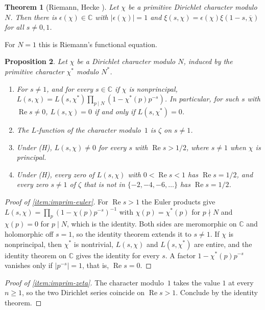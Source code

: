 \documentclass[11pt]{amsbook}
\theoremstyle{plain}
\newtheorem{theorem}{Theorem}[section]
\newtheorem{proposition}[theorem]{Proposition}
\theoremstyle{definition}
\theoremstyle{remark}
\numberwithin{equation}{section}
\numberwithin{figure}{chapter}
\numberwithin{table}{chapter}
\renewcommand{\C}{\mathbb{C}}
\begin{document}
\begin{theorem}[Riemann, Hecke \cite{Davenport2000,Riemann1859}]
\label{thm:fe}
Let $\chi$ be a primitive Dirichlet character modulo $N$. Then there is
$\epsilon(\chi)\in\C$ with $|\epsilon(\chi)|=1$ and
$\xi(s,\chi)=\epsilon(\chi)\xi(1-s,\overline\chi)$ for all $s\ne0,1$.
\end{theorem}

\noindent For $N=1$ this is Riemann's functional equation.

\begin{proposition}\label{prop:imprimitive}
Let $\chi$ be a Dirichlet character modulo $N$, induced by the
primitive character $\chi^*$ modulo $N^*$.
\begin{enumerate}[label=(\alph*)]
\item\label{item:imprim-euler} For $s\ne1$, and for every $s\in\C$ if
$\chi$ is nonprincipal,
$L(s,\chi)=L(s,\chi^*)\prod_{p\mid N}(1-\chi^*(p)p^{-s})$. In
particular, for such $s$ with $\operatorname{Re}s\ne0$, $L(s,\chi)=0$
if and only if $L(s,\chi^*)=0$.
\item\label{item:imprim-zeta} The $L$-function of the character
modulo~$1$ is $\zeta$ on $s\ne1$.
\item\label{item:imprim-all} Under (H), $L(s,\chi)\ne0$ for every $s$
with $\operatorname{Re}s>1/2$, where $s\ne1$ when $\chi$ is
principal.
\item\label{item:imprim-line} Under (H), every zero of $L(s,\chi)$
with $0<\operatorname{Re}s<1$ has $\operatorname{Re}s=1/2$, and every
zero $s\ne1$ of $\zeta$ that is not in $\{-2,-4,-6,\dots\}$ has
$\operatorname{Re}s=1/2$.
\end{enumerate}
\end{proposition}

\begin{proof}[Proof of \ref{item:imprim-euler}]
For $\operatorname{Re}s>1$ the Euler products give
$L(s,\chi)=\prod_p(1-\chi(p)p^{-s})^{-1}$ with $\chi(p)=\chi^*(p)$ for
$p\nmid N$ and $\chi(p)=0$ for $p\mid N$, which is the identity. Both
sides are meromorphic on $\C$ and holomorphic off $s=1$, so the
identity theorem extends it to $s\ne1$. If $\chi$ is nonprincipal,
then $\chi^*$ is nontrivial, $L(s,\chi)$ and $L(s,\chi^*)$ are entire,
and the identity theorem on $\C$ gives the identity for every $s$. A
factor $1-\chi^*(p)p^{-s}$ vanishes only if $|p^{-s}|=1$, that is,
$\operatorname{Re}s=0$.
\end{proof}

\begin{proof}[Proof of \ref{item:imprim-zeta}]
The character modulo~$1$ takes the value $1$ at every $n\ge1$, so the
two Dirichlet series coincide on $\operatorname{Re}s>1$. Conclude by
the identity theorem.
\end{proof}
\end{document}

